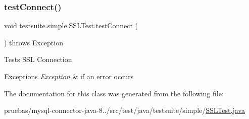 \subsubsection{\texorpdfstring{test\+Connect()}{testConnect()}}
{\footnotesize\ttfamily void testsuite.\+simple.\+S\+S\+L\+Test.\+test\+Connect (\begin{DoxyParamCaption}{ }\end{DoxyParamCaption}) throws Exception}

Tests S\+SL Connection


\begin{DoxyExceptions}{Exceptions}
{\em Exception} & if an error occurs \\
\hline
\end{DoxyExceptions}


The documentation for this class was generated from the following file\+:\begin{DoxyCompactItemize}
\item 
pruebas/mysql-\/connector-\/java-\/8../src/test/java/testsuite/simple/\mbox{\hyperlink{_s_s_l_test_8java}{S\+S\+L\+Test.\+java}}\end{DoxyCompactItemize}
